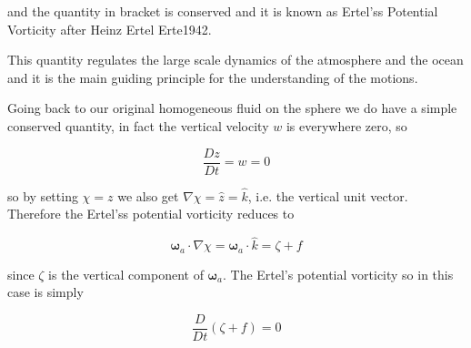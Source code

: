 and the quantity in bracket is conserved and it is known as Ertel'ss
Potential Vorticity after Heinz Ertel Erte1942.

This quantity regulates the large scale dynamics of the atmosphere and
the ocean and it is the main guiding principle for the understanding of
the motions.

Going back to our original homogeneous fluid on the sphere we do have a
simple conserved quantity, in fact the vertical velocity \(w\) is
everywhere zero, so

\[\frac{D z}{Dt} = w = 0\]

so by setting \(\chi = z\) we also get
\(\nabla \chi = \hat{z}=\hat{k}\), i.e. the vertical unit vector.
Therefore the Ertel'ss potential vorticity reduces to

\[\mathbf{\omega}_a \cdot \nabla\chi=\mathbf{\omega}_a \cdot \hat{k} = \zeta + f\]

since \(\zeta\) is the vertical component of \(\mathbf{\omega}_a\). The
Ertel's potential vorticity so in this case is simply

\[\frac{D }{Dt}(\zeta+f)=0\]
